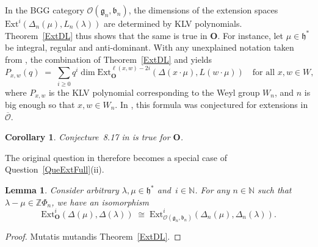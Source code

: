 \documentclass[11pt]{amsart}
\newcommand{\rR}{\Phi}
\newcommand{\cO}{\mathcal O}
\newcommand{\bO}{\mathbf{O}}
\newcommand{\Ext}{\mathrm{Ext}}
\newcommand{\fg}{\mathfrak{g}}
\newcommand{\fh}{\mathfrak{h}}
\newcommand{\fb}{\mathfrak{b}}
\newcommand{\mN}{\mathbb{N}}
\newcommand{\mZ}{\mathbb{Z}}
\numberwithin{equation}{section}
\theoremstyle{plain}
\newtheorem{lemma}[subsubsection]{Lemma}
\newtheorem{cor}[subsubsection]{Corollary}
\theoremstyle{remark}
\theoremstyle{remark}
\theoremstyle{construction}
\begin{document}
In {the} BGG category $\cO(\fg_n,\fb_n)$, the dimensions of the extension spaces $\Ext^i(\Delta_n(\mu),L_n(\lambda))$ are determined by  KLV polynomials. Theorem~\ref{ExtDL} thus shows that the same is true in $\bO$. For instance, let $\mu\in\fh^\ast$ be integral, regular and anti-dominant. With any unexplained notation taken from \cite[Section~8]{Humphreys}, the combination of Theorem~\ref{ExtDL} and \cite[Theorem~8.11(b)]{Humphreys} yields
$$P_{x,w}(q)\;=\;\sum_{i\ge 0}q^i\dim\Ext^{\ell(x,w)-2i}_{\bO}(\Delta(x\cdot\mu),L(w\cdot\mu))\quad\mbox{for all $x,w\in W$},$$ 
{where} $P_{x,w}$ {is} the KLV polynomial corresponding to the Weyl group $W_n$, {and} $n$ {is} big enough so that $x,w\in W_n$. In \cite[Conjecture~8.17]{NamT}, this formula was conjectured for extensions in $\overline{\cO}$. 

\begin{cor}
Conjecture~8.17 in \cite{NamT} is true for ${\bO}$.
\end{cor}
The original question in \cite{NamT} therefore becomes a special case of Question~\ref{QueExtFull}(ii).


\begin{lemma}
Consider arbitrary $\lambda,\mu\in\fh^\ast$ and~$i\in\mN$. For any $n\in\mN$ such that~$\lambda-\mu \in\mZ\rR_n$, we have {an isomorphism}
$$\Ext^i_{{\bO}}(\Delta(\mu),\Delta(\lambda))\;\cong\; \Ext^i_{\cO(\fg_n,\fb_n)}(\Delta_n(\mu),\Delta_n(\lambda)).$$
\end{lemma}
\begin{proof}
Mutatis mutandis Theorem~\ref{ExtDL}.
\end{proof}
\end{document}
